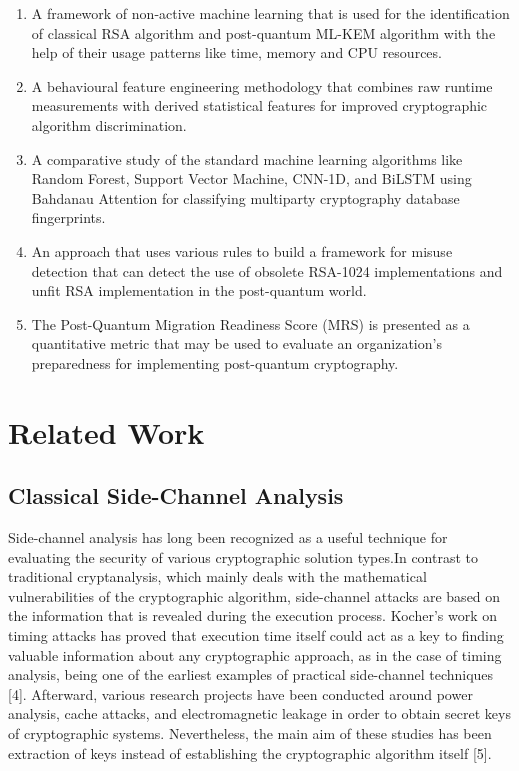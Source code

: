 \documentclass[conference]{IEEEtran}
\begin{document}
\begin{enumerate}
    \item A framework of non-active machine learning that is used for the identification of classical RSA algorithm and post-quantum ML-KEM algorithm with the help of their usage patterns like time, memory and CPU resources.
    \item A behavioural feature engineering methodology that combines raw runtime measurements with derived statistical features for improved cryptographic algorithm discrimination.
    \item A comparative study of the standard machine learning algorithms like Random Forest, Support Vector Machine, CNN-1D, and BiLSTM using Bahdanau Attention for classifying multiparty cryptography database fingerprints.
    \item An approach that uses various rules to build a framework for misuse detection that can detect the use of obsolete RSA-1024 implementations and unfit RSA implementation in the post-quantum world.
    \item The Post-Quantum Migration Readiness Score (MRS) is presented as a quantitative metric that may be used to evaluate an organization's preparedness for implementing post-quantum cryptography.
\end{enumerate}

\section{Related Work}

\subsection{Classical Side-Channel Analysis}

Side-channel analysis has long been recognized as a useful technique for evaluating the security of various cryptographic solution types.In contrast to traditional cryptanalysis, which mainly deals with the mathematical vulnerabilities of the cryptographic algorithm, side-channel attacks are based on the information that is revealed during the execution process. Kocher's work on timing attacks has proved that execution time itself could act as a key to finding valuable information about any cryptographic approach, as in the case of timing analysis, being one of the earliest examples of practical side-channel techniques [4]. Afterward, various research projects have been conducted around power analysis, cache attacks, and electromagnetic leakage in order to obtain secret keys of cryptographic systems. Nevertheless, the main aim of these studies has been extraction of keys instead of establishing the cryptographic algorithm itself [5].
\end{document}
